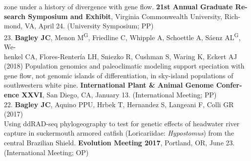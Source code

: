 \documentclass[margin,line]{res}
\begin{document}
\begin{resume}
\hspace*{8mm} zone under a history of divergence with gene flow. \textbf{21st Annual Graduate Re-}\\
\hspace*{8mm} \textbf{search Symposium and Exhibit}, Virginia Commonwealth University, Rich-\\ \vspace{2mm}
\hspace*{8mm}mond, VA, April 24. (University Symposium; PP) \\
23. \textbf{Bagley JC}, Menon M\textsuperscript{G}, Friedline C, Whipple A, Schoettle A, S\'{a}enz AL\textsuperscript{G}, We-\\
\hspace*{8mm} henkel CA, Flores-Renter\'{i}a LH, Sniezko R, Cushman S, Waring K, Eckert AJ\\
\hspace*{8mm} (2018) Population genomics and paleoclimatic modeling support speciation with\\
\hspace*{8mm} gene flow, not genomic islands of differentiation, in sky-island populations of\\
\hspace*{8mm} southwestern white pine. \textbf{International Plant \& Animal Genome Confer-}\\ \vspace{2mm}
\hspace*{8mm}\textbf{ence XXVI}, San Diego, CA, January 13. (International Meeting; PP) \\
22. \textbf{Bagley JC}, Aquino PPU, Hrbek T, Hernandez S, Langeani F, Colli GR (2017)\\
\hspace*{8mm} Using ddRAD-seq phylogeography to test for genetic effects of headwater river\\
\hspace*{8mm} capture in suckermouth armored catfish (Loricariidae: \emph{Hypostomus}) from the\\
\hspace*{8mm} central Brazilian Shield. \textbf{Evolution Meeting 2017}, Portland, OR, June 23.\\ \vspace{2mm}
\hspace*{8mm}(International Meeting; OP) \\

\end{resume}
\end{document}
